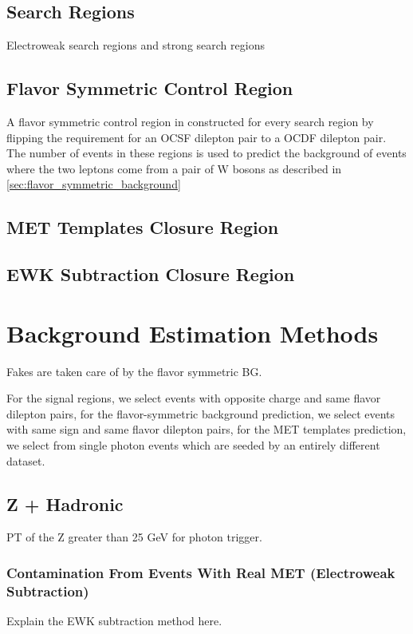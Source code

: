   \subsection{Search Regions}
    Electroweak search regions and strong search regions

  \subsection{Flavor Symmetric Control Region} \label{sec:flavor_symmetric_control_region}
    A flavor symmetric control region in constructed for every search region by flipping the requirement for an OCSF dilepton pair to a OCDF dilepton pair. The number of events in these regions is used to predict the background of events where the two leptons come from a pair of W bosons as described in \ref{sec:flavor_symmetric_background}

  \subsection{MET Templates Closure Region} \label{sec:met_templates_control_region}

  \subsection{EWK Subtraction Closure Region} \label{sec:ewk_subtraction_closure_region}



\section{Background Estimation Methods}
  Fakes are taken care of by the flavor symmetric BG.

  For the signal regions, we select events with opposite charge and same flavor dilepton pairs, for the flavor-symmetric background prediction, we select events with same sign and same flavor dilepton pairs, for the MET templates prediction, we select from single photon events which are seeded by an entirely different dataset.

  \subsection{Z + Hadronic} \label{sec:z_+_hadronic}
  PT of the Z greater than 25 GeV for photon trigger.
    
    \subsubsection{Contamination From Events With Real MET (Electroweak Subtraction)} \label{sec:ewk_subtraction}
      Explain the EWK subtraction method here.

